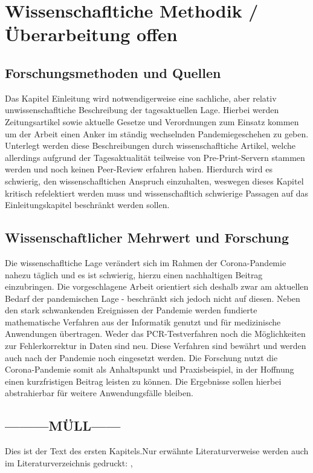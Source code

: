 
\chapter{Wissenschafltiche Methodik  / Überarbeitung offen}
\section{Forschungsmethoden und Quellen}
Das Kapitel Einleitung wird notwendigerweise eine sachliche, aber relativ unwissenschafltiche Beschreibung der tagesaktuellen Lage.
Hierbei werden Zeitungsartikel sowie aktuelle Gesetze und Verordnungen zum Einsatz kommen um der Arbeit einen Anker im ständig wechselnden Pandemiegeschehen zu geben.
Unterlegt werden diese Beschreibungen durch wissenschafltiche Artikel, welche allerdings aufgrund der Tagesaktualität teilweise von Pre-Print-Servern stammen werden und noch keinen Peer-Review erfahren haben.
Hierdurch wird es schwierig, den wissenschafltichen Anspruch einzuhalten, weswegen dieses Kapitel kritisch refelektiert werden muss und wissenschafltich schwierige Passagen auf das Einleitungskapitel beschränkt werden sollen.

\section{Wissenschaftlicher Mehrwert und Forschung}
Die wissenschafltiche Lage verändert sich im Rahmen der Corona-Pandemie nahezu täglich und es ist schwierig, hierzu einen nachhaltigen Beitrag einzubringen.
Die vorgeschlagene Arbeit orientiert sich deshalb zwar am aktuellen Bedarf der pandemischen Lage - beschränkt sich jedoch nicht auf diesen.
Neben den stark schwankenden Ereignissen der Pandemie werden fundierte mathematische Verfahren aus der Informatik genutzt und für medizinische Anwendungen übertragen.
Weder das PCR-Testverfahren noch die Möglichkeiten zur Fehlerkorrektur in Daten sind neu.
Diese Verfahren sind bewährt und werden auch nach der Pandemie noch eingesetzt werden.
Die Forschung nutzt die Corona-Pandemie somit als Anhaltspunkt und Praxisbeispiel, in der Hoffnung einen kurzfristigen Beitrag leisten zu können.
Die Ergebnisse sollen hierbei abstrahierbar für weitere Anwendungsfälle bleiben. \cite{Testbuch}



\iffalse
\section{---------MÜLL------}
Dies ist der Text des ersten Kapitels.Nur erwähnte Literaturverweise werden auch im Literaturverzeichnis gedruckt: \cite[S.12 ff]{baumgartner:2002}, \cite[S.1-3]{dreyfus:1980}

